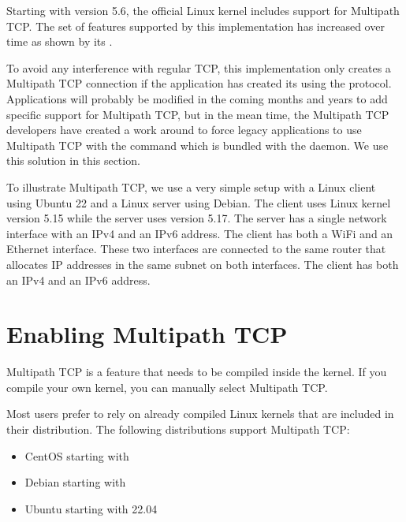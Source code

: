 \documentclass[letterpaper,10pt,english]{sphinxmanual}
\begin{document}
\sphinxAtStartPar
Starting with version 5.6, the official Linux kernel includes support for Multipath TCP. The set of features supported by this implementation has increased over time as shown by its .

\sphinxAtStartPar
To avoid any interference with regular TCP, this implementation only creates a Multipath TCP connection if the application has created its  using the  protocol. Applications will probably be modified in the coming months and years to add specific support for Multipath TCP, but in the mean time, the Multipath TCP developers have created a work around to force legacy applications to use Multipath TCP with the  command which is bundled with the  daemon. We use this solution in this section.

\sphinxAtStartPar
To illustrate Multipath TCP, we use a very simple setup with a Linux client using Ubuntu 22 and a Linux server using Debian. The client uses Linux kernel version 5.15 while the server uses version 5.17. The server has a single network interface with an IPv4 and an IPv6 address. The client has both a Wi\sphinxhyphen{}Fi and an Ethernet interface. These two interfaces are connected to the same router that allocates IP addresses in the same subnet on both interfaces. The client has both an IPv4 and an IPv6 address.


\section{Enabling Multipath TCP}
\label{\detokenize{mptcp-linux:enabling-multipath-tcp}}
\sphinxAtStartPar
Multipath TCP is a feature that needs to be compiled inside the kernel. If you compile your own kernel, you can manually select Multipath TCP.

\sphinxAtStartPar
Most users prefer to rely on already compiled Linux kernels that are included in their distribution. The following distributions support Multipath TCP:
\begin{itemize}
\item {} 
\sphinxAtStartPar
CentOS starting with

\item {} 
\sphinxAtStartPar
Debian starting with

\item {} 
\sphinxAtStartPar
Ubuntu starting with 22.04

\end{itemize}
\end{document}
